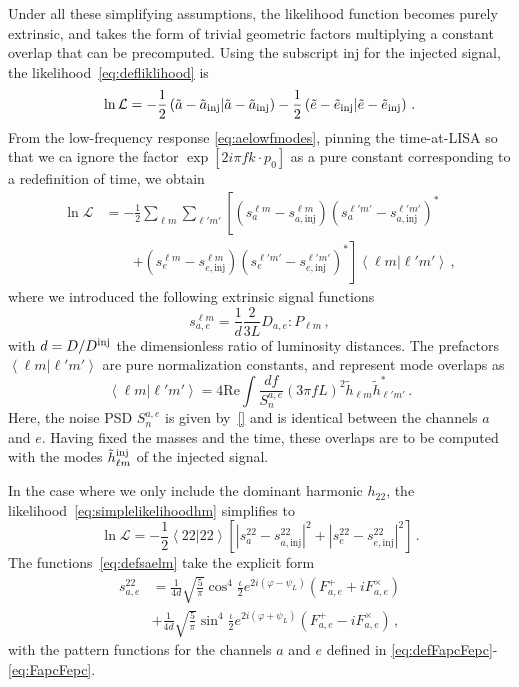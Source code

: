 \documentclass[aps,showpacs,twocolumn,prd,superscriptaddress,nofootinbib]{revtex4-1}
\newcommand{\be}{\begin{equation}}
\newcommand{\ee}{\end{equation}}
\newcommand\calL{{\mathcal{L}}}
\newcommand{\nn}{\nonumber}
\newcommand\psiL{{\psi_{L}}}
\begin{document}
Under all these simplifying assumptions, the likelihood function becomes purely extrinsic, and takes the form of trivial geometric factors multiplying a constant overlap that can be precomputed. Using the subscript $\mathrm{inj}$ for the injected signal, the likelihood~\eqref{eq:defliklihood} is
\be
	\ln \calL = -\frac{1}{2} \left( \tilde{a} - \tilde{a}_{\rm inj} | \tilde{a} - \tilde{a}_{\rm inj} \right) -\frac{1}{2} \left( \tilde{e} - \tilde{e}_{\rm inj} | \tilde{e} - \tilde{e}_{\rm inj} \right) \,.
\ee
From the low-frequency response \eqref{eq:aelowfmodes}, pinning the time-at-LISA so that we ca ignore the factor $\exp [2 i \pi f k\cdot p_{0}]$ as a pure constant corresponding to a redefinition of time, we obtain 
\begin{align}\label{eq:simplelikelihoodhm}
	\ln \calL &= -\frac{1}{2} \sum_{\ell m} \sum_{\ell' m'}   \left[ \left( s_{a}^{\ell m} - s_{a, \mathrm{inj}}^{\ell m}\right) \left( s_{a}^{\ell' m'} - s_{a, \mathrm{inj}}^{\ell' m'}\right)^{*} \right. \nn\\
	& \qquad \left. + \left( s_{e}^{\ell m} - s_{e, \mathrm{inj}}^{\ell m}\right) \left( s_{e}^{\ell' m'} - s_{e, \mathrm{inj}}^{\ell' m'}\right)^{*} \right] \left\langle \ell m | \ell' m' \right\rangle \,,
\end{align}
where we introduced the following extrinsic signal functions
\be\label{eq:defsaelm}
	s_{a,e}^{\ell m} = \frac{1}{d} \frac{2}{3L} D_{a,e} : P_{\ell m} \,,
\ee
with $d = D / D^{\rm inj}$ the dimensionless ratio of luminosity distances. The prefactors $\left\langle \ell m | \ell' m' \right\rangle$ are pure normalization constants, and represent mode overlaps as
\be\label{eq:innerproductlmlpmp}
	\left\langle \ell m | \ell' m' \right\rangle = 4\mathrm{Re} \int \frac{df}{S_{n}^{a,e}} \left( 3 \pi f L\right)^{2} \tilde{h}_{\ell m} \tilde{h}_{\ell' m'}^{*} \,.
\ee
Here, the noise PSD $S_{n}^{a,e}$ is given by~\eqref{} and is identical between the channels $a$ and $e$. Having fixed the masses and the time, these overlaps are to be computed with the modes $\tilde{h}_{\ell m}^{\rm inj}$ of the injected signal.

In the case where we only include the dominant harmonic $h_{22}$, the likelihood~\eqref{eq:simplelikelihoodhm} simplifies to
\be\label{eq:simplelikelihood22}
	\ln \calL = -\frac{1}{2} \left\langle 22 | 22 \right\rangle  \left[ \left| s_{a}^{22} - s_{a, \mathrm{inj}}^{22} \right|^{2} + \left| s_{e}^{22} - s_{e, \mathrm{inj}}^{22}\right|^{2} \right] \,.
\ee
The functions~\eqref{eq:defsaelm} take the explicit form
\begin{align}
	s_{a,e}^{22} &= \frac{1}{4d} \sqrt{\frac{5}{\pi}} \cos^{4}\frac{\iota}{2} e^{2i(\varphi-\psiL)} \left( F_{a,e}^{+} + i F_{a,e}^{\times} \right) \\
	&+ \frac{1}{4d} \sqrt{\frac{5}{\pi}} \sin^{4}\frac{\iota}{2} e^{2i(\varphi+\psiL)} \left( F_{a,e}^{+} - i F_{a,e}^{\times} \right) \,,
\end{align}
with the pattern functions for the channels $a$ and $e$ defined in \eqref{eq:defFapcFepc}-\eqref{eq:FapcFepc}.
\end{document}
